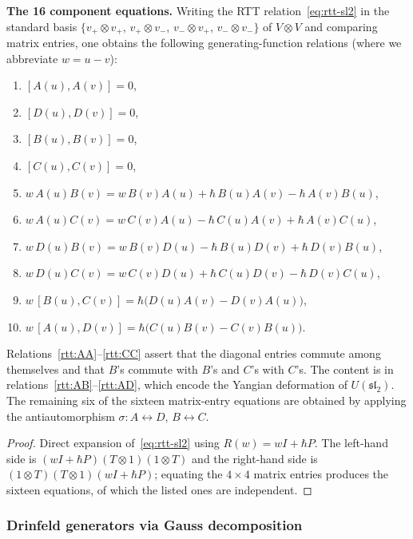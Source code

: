 \begin{theorem}
\textbf{The 16 component equations.}
Writing the RTT relation~\eqref{eq:rtt-sl2} in the standard basis
$\{v_+\otimes v_+,\,v_+\otimes v_-,\,v_-\otimes v_+,\,v_-\otimes v_-\}$
of $V\otimes V$ and comparing matrix entries, one obtains the following
generating-function relations (where we abbreviate $w=u-v$):
\begin{enumerate}[label=\textup{(\arabic*)}]
\item\label{rtt:AA}
$[A(u),A(v)]=0$,
\item\label{rtt:DD}
$[D(u),D(v)]=0$,
\item\label{rtt:BB}
$[B(u),B(v)]=0$,
\item\label{rtt:CC}
$[C(u),C(v)]=0$,
\item\label{rtt:AB}
$w\,A(u)B(v)=w\,B(v)A(u)+\hbar\,B(u)A(v)-\hbar\,A(v)B(u)$,
\item\label{rtt:AC}
$w\,A(u)C(v)=w\,C(v)A(u)-\hbar\,C(u)A(v)+\hbar\,A(v)C(u)$,
\item\label{rtt:DB}
$w\,D(u)B(v)=w\,B(v)D(u)-\hbar\,B(u)D(v)+\hbar\,D(v)B(u)$,
\item\label{rtt:DC}
$w\,D(u)C(v)=w\,C(v)D(u)+\hbar\,C(u)D(v)-\hbar\,D(v)C(u)$,
\item\label{rtt:BC}
$w\,[B(u),C(v)]=\hbar\bigl(D(u)A(v)-D(v)A(u)\bigr)$,
\item\label{rtt:AD}
$w\,[A(u),D(v)]=\hbar\bigl(C(u)B(v)-C(v)B(u)\bigr)$.
\end{enumerate}
Relations~\ref{rtt:AA}--\ref{rtt:CC} assert that the diagonal entries
commute among themselves and that $B$'s commute with $B$'s and $C$'s
with $C$'s. The content is in relations~\ref{rtt:AB}--\ref{rtt:AD},
which encode the Yangian deformation of $U(\mathfrak{sl}_2)$.
The remaining six of the sixteen matrix-entry equations are obtained by
applying the antiautomorphism $\sigma:A\leftrightarrow D$,
$B\leftrightarrow C$.
\end{theorem}

\begin{proof}
Direct expansion of~\eqref{eq:rtt-sl2} using $R(w)=wI+\hbar P$. The
left-hand side is $(wI+\hbar P)(T\otimes 1)(1\otimes T)$ and the
right-hand side is $(1\otimes T)(T\otimes 1)(wI+\hbar P)$; equating
the $4\times 4$ matrix entries produces the sixteen equations, of
which the listed ones are independent.
\end{proof}

\subsubsection*{Drinfeld generators via Gauss decomposition}

